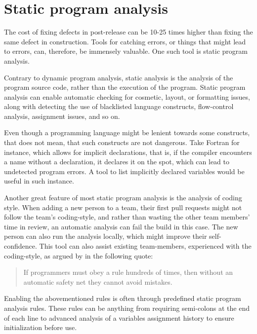 \section{Static program analysis}

The cost of fixing defects in post-release can be 10-25 times higher than fixing the same defect in construction\cite[p.~29]{mcconnell_code_2004}. Tools for catching errors, or things that might lead to errors, can, therefore, be immensely valuable. One such tool is static program analysis.

Contrary to dynamic program analysis, static analysis is the analysis of the program source code, rather than the execution of the program\cite{wichmann_industrial_1995}. Static program analysis can enable automatic checking for cosmetic, layout, or formatting issues, along with detecting the use of blacklisted language constructs, flow-control analysis, assignment issues, and so on\cite{wichmann_industrial_1995}. 

Even though a programming language might be lenient towards some constructs, that does not mean, that such constructs are not dangerous. Take Fortran for instance, which allows for implicit declarations, that is, if the compiler encounters a name without a declaration, it declares it on the spot, which can lead to undetected program errors\cite{wichmann_industrial_1995}. A tool to list implicitly declared variables would be useful in such instance.

Another great feature of most static program analysis is the analysis of coding style. When adding a new person to a team, their first pull requests might not follow the team's coding-style, and rather than wasting the other team members' time in review, an automatic analysis can fail the build in this case. The new person can also run the analysis locally, which might improve their self-confidence. This tool can also assist existing team-members, experienced with the coding-style, as argued by \cite{bessey_few_2010} in the following quote:

\begin{quote}
    If programmers must obey a rule hundreds of times, then without an automatic safety net they cannot avoid mistakes.\cite{bessey_few_2010}
\end{quote}

Enabling the abovementioned rules is often through predefined static program analysis rules\cite{bessey_few_2010}. These rules can be anything from requiring semi-colons at the end of each line to advanced analysis of a variables assignment history to ensure initialization before use.

